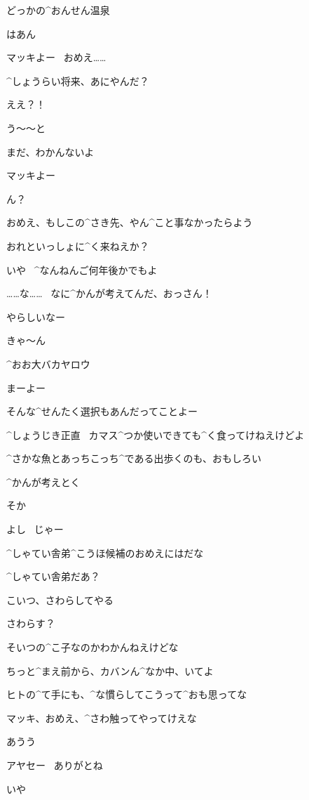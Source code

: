 \Makki どっかの^{おんせん}{温泉}

\Ayase はあん

\page
\Ayase マッキよー
\ おめえ……

\Ayase ^{しょうらい}{将来}、あにやんだ？

\Makki ええ？！

\Makki う〜〜と

\Makki まだ、わかんないよ

\page
\Ayase マッキよー

\Makki ん？

\Ayase おめえ、もしこの^{さき}{先}、やん^{こと}{事}なかったらよう

\Ayase おれといっしょに^{く}{来}ねえか？

\Ayase いや
\ ^{なんねんご}{何年後}かでもよ

\page
\Makki ……な……
\ なに^{かんが}{考}えてんだ、おっさん！

\Makki やらしいなー

\Makki きゃ〜ん

\Ayase ^{おお}{大}バカヤロウ

\Ayase まーよー

\Ayase そんな^{せんたく}{選択}もあんだってことよー

\Ayase ^{しょうじき}{正直}
\ カマス^{つか}{使}いできても^{く}{食}ってけねえけどよ

\Ayase ^{さかな}{魚}とあっちこっち^{である}{出歩}くのも、おもしろい

\page
\Makki ^{かんが}{考}えとく

\Ayase そか

\Ayase よし
\ じゃー

\Ayase ^{しゃてい}{舎弟}^{こうほ}{候補}のおめえにはだな

\Makki ^{しゃてい}{舎弟}だあ？

\Ayase こいつ、さわらしてやる

\Makki さわらす？

\page[147]
\Ayase そいつの^{こ}{子}なのかわかんねえけどな

\Ayase ちっと^{まえ}{前}から、カバンん^{なか}{中}、いてよ

\Ayase ヒトの^{て}{手}にも、^{な}{慣}らしてこうって^{おも}{思}ってな

\Ayase マッキ、おめえ、^{さわ}{触}ってやってけえな

\page[149]
\Makki あうう

\page
\Makki アヤセー
\ ありがとね

\Ayase いや

